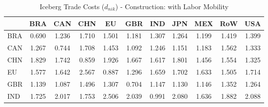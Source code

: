 \begin{table}[htbp]
\centering
\caption{Iceberg Trade Costs ($d_{nik}$) - Construction: with Labor Mobility} 
\label{tab:iceberg_Construction}
\begin{tabular}{lcccccccccc}
  \hline
 & BRA & CAN & CHN & EU & GBR & IND & JPN & MEX & RoW & USA \\ 
  \hline
BRA & \textcolor[RGB]{247,160,8}{0.690} & \textcolor[RGB]{168,109,87}{1.236} & \textcolor[RGB]{46,30,209}{1.710} & \textcolor[RGB]{87,56,168}{1.501} & \textcolor[RGB]{181,117,74}{1.181} & \textcolor[RGB]{140,91,115}{1.307} & \textcolor[RGB]{153,99,102}{1.264} & \textcolor[RGB]{173,112,82}{1.199} & \textcolor[RGB]{105,68,150}{1.419} & \textcolor[RGB]{115,74,140}{1.399} \\ 
  CAN & \textcolor[RGB]{150,97,105}{1.267} & \textcolor[RGB]{240,155,15}{0.744} & \textcolor[RGB]{48,31,207}{1.708} & \textcolor[RGB]{99,64,156}{1.453} & \textcolor[RGB]{217,140,38}{1.092} & \textcolor[RGB]{161,104,94}{1.246} & \textcolor[RGB]{186,120,69}{1.151} & \textcolor[RGB]{176,114,79}{1.183} & \textcolor[RGB]{74,48,181}{1.562} & \textcolor[RGB]{125,81,130}{1.333} \\ 
  CHN & \textcolor[RGB]{25,16,230}{1.829} & \textcolor[RGB]{38,25,217}{1.742} & \textcolor[RGB]{237,153,18}{0.859} & \textcolor[RGB]{18,12,237}{1.926} & \textcolor[RGB]{56,36,199}{1.667} & \textcolor[RGB]{69,45,186}{1.617} & \textcolor[RGB]{31,20,224}{1.801} & \textcolor[RGB]{97,63,158}{1.456} & \textcolor[RGB]{77,50,178}{1.554} & \textcolor[RGB]{133,86,122}{1.325} \\ 
  EU & \textcolor[RGB]{71,46,184}{1.577} & \textcolor[RGB]{61,40,194}{1.642} & \textcolor[RGB]{0,0,255}{2.567} & \textcolor[RGB]{235,152,20}{0.887} & \textcolor[RGB]{143,92,112}{1.296} & \textcolor[RGB]{59,38,196}{1.659} & \textcolor[RGB]{51,33,204}{1.702} & \textcolor[RGB]{66,43,189}{1.633} & \textcolor[RGB]{84,54,171}{1.505} & \textcolor[RGB]{43,28,212}{1.714} \\ 
  GBR & \textcolor[RGB]{199,129,56}{1.139} & \textcolor[RGB]{219,142,36}{1.087} & \textcolor[RGB]{89,58,166}{1.496} & \textcolor[RGB]{138,89,117}{1.307} & \textcolor[RGB]{245,158,10}{0.704} & \textcolor[RGB]{191,124,64}{1.147} & \textcolor[RGB]{207,134,48}{1.130} & \textcolor[RGB]{194,125,61}{1.146} & \textcolor[RGB]{120,78,135}{1.352} & \textcolor[RGB]{156,101,99}{1.264} \\ 
  IND & \textcolor[RGB]{41,26,214}{1.725} & \textcolor[RGB]{15,10,240}{2.017} & \textcolor[RGB]{36,23,219}{1.753} & \textcolor[RGB]{3,2,252}{2.506} & \textcolor[RGB]{13,8,242}{2.039} & \textcolor[RGB]{230,148,26}{0.991} & \textcolor[RGB]{10,7,245}{2.080} & \textcolor[RGB]{64,41,191}{1.636} & \textcolor[RGB]{20,13,235}{1.882} & \textcolor[RGB]{8,5,247}{2.088} \\ 

\end{tabular}
\end{table}
